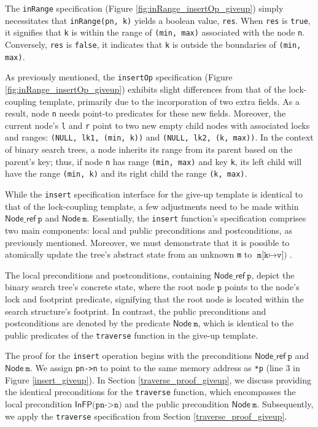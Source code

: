 \documentclass[a4paper,UKenglish,cleveref, autoref, thm-restate]{lipics-v2021}
\newcommand{\treerep}{\ensuremath{\mathsf{Node}}}
\newcommand{\nodeboxrep}{\ensuremath{\mathsf{Node\_ref}}}
\newcommand{\infp}{\ensuremath{\mathsf{InFP}}}
\begin{document}
The \texttt{inRange} specification (Figure \ref{fig:inRange_insertOp_giveup}) simply necessitates that \texttt{inRange(pn, k)}  yields a boolean value, \texttt{res}. When \texttt{res} is \texttt{true}, it signifies that \texttt{k} is within the range of \texttt{(min, max)} associated with the node \texttt{n}. 
Conversely, \texttt{res} is \texttt{false}, it indicates that \texttt{k} is outside the boundaries of \texttt{(min, max)}. 

As previously mentioned, the \texttt{insertOp} specification (Figure \ref{fig:inRange_insertOp_giveup}) exhibits slight differences from that of the lock-coupling template, primarily due to the incorporation of two extra fields. As a result, node \texttt{n} needs point-to predicates for these new fields. Moreover, the current node's \texttt{l} and \texttt{r} point to two new empty child nodes with associated locks and ranges: \texttt{(NULL, lk1, (min, k))} and \texttt{(NULL, lk2, (k, max))}.  In the context of binary search trees, a node inherits its range from its parent based on the parent's key; thus, if node \texttt{n} has range \texttt{(min, max)} and key \texttt{k}, its left child will have the range \texttt{(min, k)} and its right child the range \texttt{(k, max)}. 


While the \texttt{insert} specification interface for the give-up template is identical to that of the lock-coupling template, a few adjustments need to be made within $\nodeboxrep\ \texttt{p}$ and $\treerep \ \texttt{m}$. Essentially, the \texttt{insert} function's specification comprises two main components: local and public preconditions and postconditions, as previously mentioned. Moreover, we must demonstrate that it is possible to atomically update the tree's abstract state from an unknown \texttt{m} to $\texttt{m[k} \mapsto \texttt{v])}$.

The local preconditions and postconditions, containing $\nodeboxrep \ \texttt{p}$, depict the binary search tree's concrete state, where the root node $\texttt{p}$ points to the node's lock and footprint predicate, signifying that the root node is located within the search structure's footprint. In contrast, the public preconditions and postconditions are denoted by the predicate  $\treerep \ \texttt{m}$, which is identical to the public predicates of the \texttt{traverse} function in the give-up template. 

The proof for the \texttt{insert} operation begins with the preconditions $\nodeboxrep \ \texttt{p}$ and $\treerep \ \texttt{m}$. We assign \texttt{pn->n} to point to the same memory address as \texttt{*p} (line 3 in Figure \ref{insert_giveup}). In Section \ref{traverse_proof_giveup}, we discuss providing the identical preconditions for the \texttt{traverse} function, which encompasses the local precondition $\infp\texttt{(pn->n)}$ and the public precondition $\treerep\ \texttt{m}$. Subsequently, we apply the \texttt{traverse} specification from Section \ref{traverse_proof_giveup}.
\end{document}
